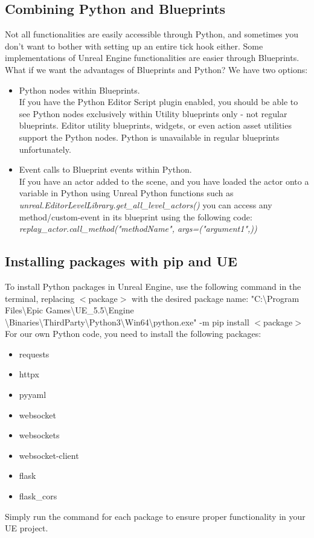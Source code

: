 \documentclass{uva-inf-article}
\begin{document}
\subsection{Combining Python and Blueprints}
Not all functionalities are easily accessible through Python, and sometimes you don't want to bother with setting up an entire tick hook either. Some implementations of Unreal Engine functionalities are easier through Blueprints. What if we want the advantages of Blueprints and Python? We have two options:
\begin{itemize}
    \item Python nodes within Blueprints.\\
    If you have the Python Editor Script plugin enabled, you should be able to see Python nodes exclusively within Utility blueprints only - not regular blueprints. Editor utility blueprints, widgets, or even action asset utilities support the Python nodes. Python is unavailable in regular blueprints unfortunately. 
    \item Event calls to Blueprint events within Python.\\
    If you have an actor added to the scene, and you have loaded the actor onto a variable in Python using Unreal Python functions such as \textit{unreal.EditorLevelLibrary.get\_all\_level\_actors()} you can access any method/custom-event in its blueprint using the following code: \textit{replay\_actor.call\_method("methodName", args=("argument1",))}
\end{itemize}

\subsection{Installing packages with pip and UE}
To install Python packages in Unreal Engine, use the following command in the terminal, replacing $<$package$>$ with the desired package name:
"C:\textbackslash Program Files\textbackslash Epic Games\textbackslash UE\_5.5\textbackslash Engine \textbackslash Binaries\textbackslash ThirdParty\textbackslash Python3\textbackslash Win64\textbackslash python.exe" -m pip install $<$package$>$
For our own Python code, you need to install the following packages:
\begin{itemize}
    \item requests
    \item httpx
    \item pyyaml
    \item websocket
    \item websockets
    \item websocket-client
    \item flask
    \item flask\_cors
\end{itemize}
Simply run the command for each package to ensure proper functionality in your UE project.
\end{document}
